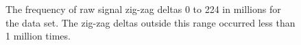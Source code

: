 \begin{figure}
	\centering

	\caption[The frequency of raw signal zig-zag deltas.]{\label{fig:zd-hist}The frequency of raw signal zig-zag deltas 0 to 224 in millions for the data set. The zig-zag deltas outside this range occurred less than 1 million times.}
\end{figure}
